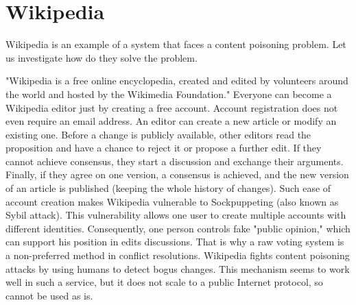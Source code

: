 \section{Wikipedia}
Wikipedia is an example of a system that faces a content poisoning problem. Let us investigate how do they solve the problem. 

"Wikipedia is a free online encyclopedia, created and edited by volunteers around the world and hosted by the Wikimedia Foundation."
Everyone can become a Wikipedia editor just by creating a free account. Account registration does not even require an email address. An editor can create a new article or modify an existing one. Before a change is publicly available, other editors read the proposition and have a chance to reject it or propose a further edit. If they cannot achieve consensus, they start a discussion and exchange their arguments. Finally, if they agree on one version, a consensus is achieved, and the new version of an article is published (keeping the whole history of changes).
Such ease of account creation makes Wikipedia vulnerable to Sockpuppeting (also known as Sybil attack). This vulnerability allows one user to create multiple accounts with different identities. Consequently, one person controls fake "public opinion," which can support his position in edits discussions. That is why a raw voting system is a non-preferred method in conflict resolutions.
Wikipedia fights content poisoning attacks by using humans to detect bogus changes. This mechanism seems to work well in such a service, but it does not scale to a public Internet protocol, so cannot be used as is.

